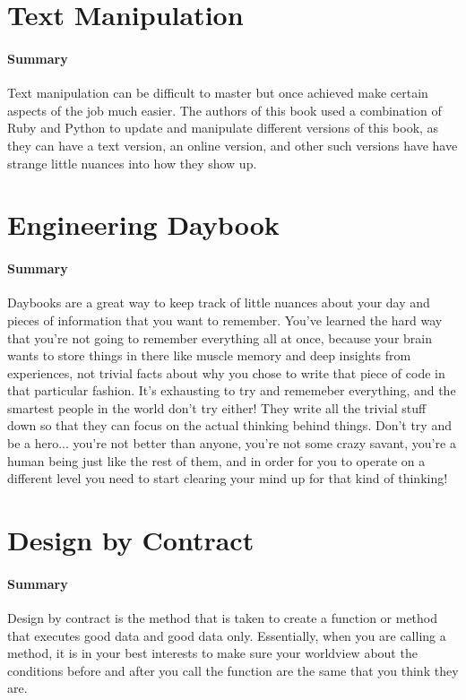 \documentclass{article}
\begin{document}
\section{Text Manipulation}
    \paragraph{Summary} Text manipulation can be difficult to master but once achieved make certain aspects of the job much easier. The authors of this book used a combination of Ruby and Python to update and manipulate different versions of this book, as they can have a text version, an online version, and other such versions have have strange little nuances into how they show up. 

\section{Engineering Daybook}
    \paragraph{Summary} Daybooks are a great way to keep track of little nuances about your day and pieces of information that you want to remember. You've learned the hard way that you're not going to remember everything all at once, because your brain wants to store things in there like muscle memory and deep insights from experiences, not trivial facts about why you chose to write that piece of code in that particular fashion. It's exhausting to try and rememeber everything, and the smartest people in the world don't try either! They write all the trivial stuff down so that they can focus on the actual thinking behind things. Don't try and be a hero... you're not better than anyone, you're not some crazy savant, you're a human being just like the rest of them, and in order for you to operate on a different level you need to start clearing your mind up for that kind of thinking!

\section{Design by Contract}
    \paragraph{Summary} Design by contract is the method that is taken to create a function or method that executes good data and good data only. Essentially, when you are calling a method, it is in your best interests to make sure your worldview about the conditions before and after you call the function are the same that you think they are.
\end{document}
